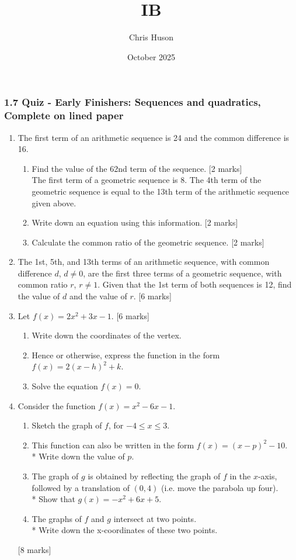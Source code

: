 \documentclass[12pt, twoside]{article}
\title{IB}
\author{Chris Huson}
\date{October 2025}
\begin{document}
\subsubsection*{1.7 Quiz - Early Finishers: Sequences and quadratics, Complete on lined paper}
\begin{enumerate}[itemsep=0.5cm]

\item The first term of an arithmetic sequence is 24 and the common difference is 16.
    \begin{enumerate}
        \item Find the value of the 62nd term of the sequence. \hfill [2 marks] \\[0.5cm]
        The first term of a geometric sequence is 8. The 4th term of the geometric sequence is equal to the 13th term of the arithmetic sequence given above. \vspace{0.25cm}
        \item Write down an equation using this information. \hfill [2 marks]
        \item Calculate the common ratio of the geometric sequence. \hfill [2 marks]
    \end{enumerate}

\item The 1st, 5th, and 13th terms of an arithmetic sequence, with common difference $d$, 
$d\ne 0$, are the first three terms of a geometric sequence, with common ratio $r$, $r \ne 1$. Given that the 1st term of both sequences is 12, find the value of $d$ and the value of $r$. \hfill [6 marks]


\item Let $f(x)=2x^2+3x-1$. \hfill [6 marks]
    \begin{enumerate}
        \item Write down the coordinates of the vertex.
        \item Hence or otherwise, express the function in the form $f(x)=2(x-h)^2 +k$.
        \item Solve the equation  $f(x)=0$.
    \end{enumerate}

\item Consider the function $f(x)=x^2-6x-1$.
    \begin{enumerate}
        \item Sketch the graph of $f$, for $-4 \leq x \leq 3$.
        \item This function can also be written in the form $f(x)=(x-p)^2 -10$.\\*
        Write down the value of $p$.
        \item The graph of $g$ is obtained by reflecting the graph of $f$ in the $x$-axis, followed by a translation of $(0, 4)$ (i.e. move the parabola up four).\\* Show that $g(x)=-x^2+6x+5$.
        \item The graphs of $f$ and $g$ intersect at two points.\\*
        Write down the x-coordinates of these two points.
    \end{enumerate} \hfill [8 marks]

       
\end{enumerate}
\end{document}
